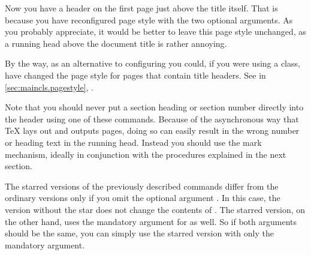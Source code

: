 \begin{Example}
\begin{lstcode}
\end{lstcode}
  Now you have a header on the first page just above the title itself.
  That is because you have reconfigured page style
   with the two optional
  arguments. As you probably appreciate, it would be better to leave this page
  style unchanged, as a running head above the document title is rather
  annoying.
  
  By the way, as an alternative to configuring
   you could, if you were
  using a \KOMAScript{} class, have changed the page style for pages that
  contain title headers. See %
   in \autoref{sec:maincls.pagestyle},
  .
\end{Example}

Note that you should never put a section
heading or section number directly into the header using one of these
commands. Because of the asynchronous way that \TeX{} lays out and outputs
pages, doing so can easily result in the wrong number or heading text in the
running head. Instead you should use the mark mechanism, ideally in
conjunction with the procedures explained in the next section.%
\EndIndexGroup

\begin{Declaration}
\end{Declaration}
The starred versions of the
previously described commands differ from the ordinary versions only if you
omit the optional argument . In this case,
the version without the star does not change the contents of
. The starred version, on the
other hand, uses the mandatory argument 
for  as well. So if both
arguments should be the same, you can simply use the starred version with only
the mandatory argument.%


